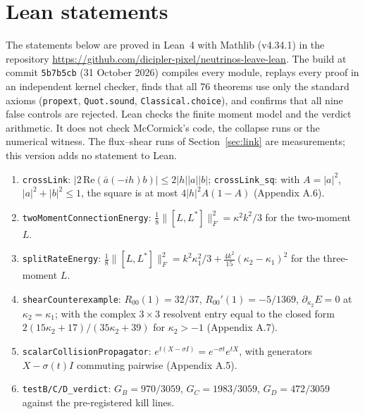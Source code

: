 \documentclass[11pt]{article}
\begin{document}
\section{Lean statements}
The statements below are proved in Lean~4 with Mathlib (v4.34.1) in the repository \url{https://github.com/dicipler-pixel/neutrinos-leave-lean}. The build at commit \texttt{5b7b5cb} (31 October 2026) compiles every module, replays every proof in an independent kernel checker, finds that all 76 theorems use only the standard axioms (\texttt{propext}, \texttt{Quot.sound}, \texttt{Classical.choice}), and confirms that all nine false controls are rejected. Lean checks the finite moment model and the verdict arithmetic. It does not check McCormick's code, the collapse runs or the numerical witness. The flux--shear runs of Section~\ref{sec:link} are measurements; this version adds no statement to Lean.
\begin{enumerate}
\item \texttt{crossLink}: $|2\,\mathrm{Re}(\bar a(-ih)b)|\le2|h||a||b|$; \texttt{crossLink\_sq}: with $A=|a|^2$, $|a|^2+|b|^2\le1$, the square is at most $4|h|^2A(1-A)$ (Appendix A.6).
\item \texttt{twoMomentConnectionEnergy}: $\tfrac18\lVert[L,L^\ast]\rVert_F^2=\kappa^2k^2/3$ for the two-moment $L$.
\item \texttt{splitRateEnergy}: $\tfrac18\lVert[L,L^\ast]\rVert_F^2=k^2\kappa_1^2/3+\tfrac{4k^2}{15}(\kappa_2-\kappa_1)^2$ for the three-moment $L$.
\item \texttt{shearCounterexample}: $R_{00}(1)=32/37$, $R_{00}'(1)=-5/1369$, $\partial_{\kappa_2}E=0$ at $\kappa_2=\kappa_1$; with the complex $3\times3$ resolvent entry equal to the closed form $2(15\kappa_2+17)/(35\kappa_2+39)$ for $\kappa_2>-1$ (Appendix A.7).
\item \texttt{scalarCollisionPropagator}: $e^{t(X-\sigma I)}=e^{-\sigma t}e^{tX}$, with generators $X-\sigma(t)I$ commuting pairwise (Appendix A.5).
\item \texttt{testB/C/D\_verdict}: $G_B=970/3059$, $G_C=1983/3059$, $G_D=472/3059$ against the pre-registered kill lines.
\end{enumerate}
\end{document}
